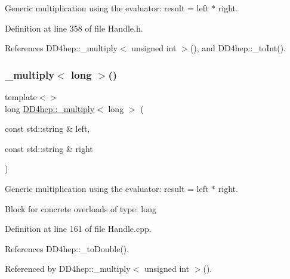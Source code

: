 Generic multiplication using the evaluator\+: result = left $\ast$ right. 



Definition at line 358 of file Handle.\+h.



References D\+D4hep\+::\+\_\+multiply$<$ unsigned int $>$(), and D\+D4hep\+::\+\_\+to\+Int().

\hypertarget{group___d_d4_h_e_p___g_e_o_m_e_t_r_y_ga06d67a52662b07a372903712ab104b42}{}\label{group___d_d4_h_e_p___g_e_o_m_e_t_r_y_ga06d67a52662b07a372903712ab104b42} 
\subsubsection{\texorpdfstring{\+\_\+multiply$<$ long $>$()}{\_multiply< long >()}\hspace{0.1cm}{\footnotesize\ttfamily [1/3]}}
{\footnotesize\ttfamily template$<$$>$ \\
long \hyperlink{group___d_d4_h_e_p___g_e_o_m_e_t_r_y_gab860c2299e2eb50e537c5079fb0c9c51}{D\+D4hep\+::\+\_\+multiply}$<$ long $>$ (\begin{DoxyParamCaption}\item[{const std\+::string \&}]{left,  }\item[{const std\+::string \&}]{right }\end{DoxyParamCaption})}



Generic multiplication using the evaluator\+: result = left $\ast$ right. 

Block for concrete overloads of type\+: long 

Definition at line 161 of file Handle.\+cpp.



References D\+D4hep\+::\+\_\+to\+Double().



Referenced by D\+D4hep\+::\+\_\+multiply$<$ unsigned int $>$().

\hypertarget{group___d_d4_h_e_p___g_e_o_m_e_t_r_y_ga94f854e90f4a38c76c094a989b1e8a64}{}\label{group___d_d4_h_e_p___g_e_o_m_e_t_r_y_ga94f854e90f4a38c76c094a989b1e8a64} 
